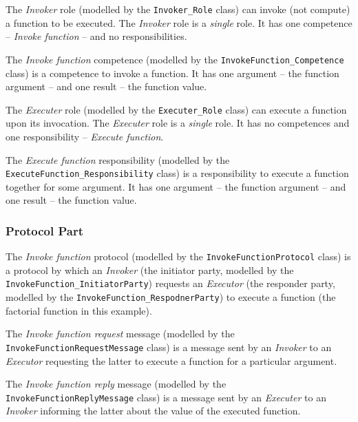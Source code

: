 The \textit{Invoker} role (modelled by the \texttt{Invoker\_Role} class) can invoke (not compute) a function to be executed.
The \textit{Invoker} role is a \textit{single} role.
It has one competence -- \textit{Invoke function} -- and no responsibilities.

The \textit{Invoke function} competence (modelled by the \texttt{InvokeFunction\_Competence} class) is a competence to invoke a function.
It has one argument -- the function argument -- and one result -- the function value. 

The \textit{Executer} role (modelled by the \texttt{Executer\_Role} class) can execute a function upon its invocation.
The \textit{Executer} role is a \textit{single} role.
It has no competences and one responsibility -- \textit{Execute function}.

The \textit{Execute function} responsibility (modelled by the \texttt{ExecuteFunction\_Responsibility} class) is a responsibility to execute a function together for some argument.
It has one argument -- the function argument -- and one result -- the function value.

\subsubsection*{Protocol Part}

The \textit{Invoke function} protocol (modelled by the \texttt{InvokeFunctionProtocol} class) is a protocol by which an \textit{Invoker} (the initiator party, modelled by the \texttt{InvokeFunction\_InitiatorParty}) requests an \textit{Executor} (the responder party, modelled by the \texttt{InvokeFunction\_RespodnerParty}) to execute a function (the factorial function in this example).

The \textit{Invoke function request} message (modelled by the \texttt{InvokeFunctionRequestMessage} class) is a message sent by an \textit{Invoker} to an \textit{Executor} requesting the latter to execute a function for a particular argument.

The \textit{Invoke function reply} message (modelled by the \texttt{InvokeFunctionReplyMessage} class) is a message sent by an \textit{Executer} to an \textit{Invoker} informing the latter about the value of the executed function.

